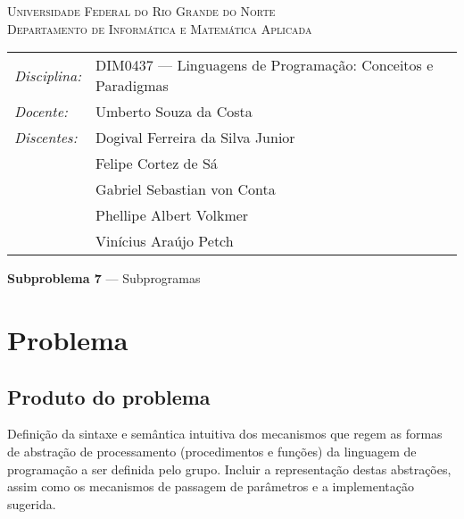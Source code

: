 \documentclass[12pt, a4paper]{article}
\begin{document}
\begin{center}
    \textsc{Universidade Federal do Rio Grande do Norte} \\
    \textsc{Departamento de Informática e Matemática Aplicada}
\end{center}

\bigskip

\begin{tabular}{@{}ll@{}}
    \emph{Disciplina:} & DIM0437 --- Linguagens de Programação:
                            Conceitos e Paradigmas \\
    \emph{Docente:}    & Umberto Souza da Costa \\
    \emph{Discentes:}  & Dogival Ferreira da Silva Junior \\
                       & Felipe Cortez de Sá \\
                       & Gabriel Sebastian von Conta \\
                       & Phellipe Albert Volkmer \\
                       & Vinícius Araújo Petch
\end{tabular}

\bigskip

\begin{center}
\large \textbf{Subproblema 7} --- Subprogramas
\end{center}

\section{Problema}
    \subsection{Produto do problema}
    Definição da sintaxe e semântica intuitiva dos mecanismos que regem as
    formas de abstração de processamento (procedimentos e funções) da
    linguagem de programação a ser definida pelo grupo. Incluir a
    representação destas abstrações, assim como os mecanismos de passagem
    de parâmetros e a implementação sugerida.
\end{document}
